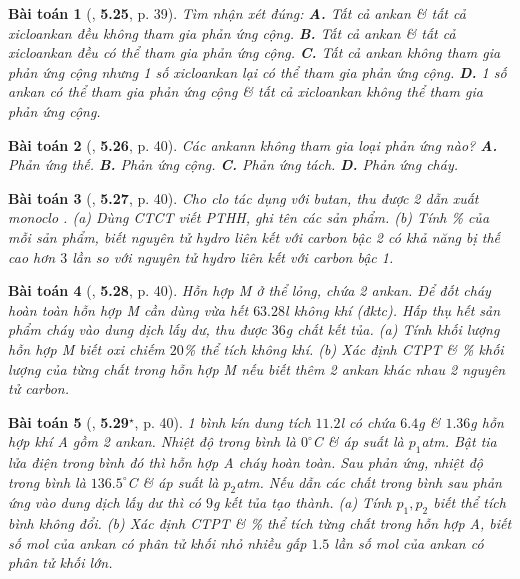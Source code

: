 \documentclass{article}
\numberwithin{equation}{section}
\newtheorem{baitoan}{Bài toán}[section]
\begin{document}
\begin{baitoan}[\cite{SBT_Hoa_Hoc_11_co_ban}, \textbf{5.25}, p. 39]
	Tìm nhận xét đúng: {\bf A.} Tất cả ankan \& tất cả xicloankan đều không tham gia phản ứng cộng. {\bf B.} Tất cả ankan \& tất cả xicloankan đều có thể tham gia phản ứng cộng. {\bf C.} Tất cả ankan không tham gia phản ứng cộng nhưng 1 số xicloankan lại có thể tham gia phản ứng cộng. {\bf D.} 1 số ankan có thể tham gia phản ứng cộng \& tất cả xicloankan không thể tham gia phản ứng cộng.
\end{baitoan}

\begin{baitoan}[\cite{SBT_Hoa_Hoc_11_co_ban}, \textbf{5.26}, p. 40]
	Các ankann không tham gia loại phản ứng nào? {\bf A.} Phản ứng thế. {\bf B.} Phản ứng cộng. {\bf C.} Phản ứng tách. {\bf D.} Phản ứng cháy.
\end{baitoan}

\begin{baitoan}[\cite{SBT_Hoa_Hoc_11_co_ban}, \textbf{5.27}, p. 40]
	Cho clo tác dụng với butan, thu được 2 dẫn xuất monoclo \emph{}. (a) Dùng CTCT viết PTHH, ghi tên các sản phẩm. (b) Tính \% của mỗi sản phẩm, biết nguyên tử hydro liên kết với carbon bậc 2 có khả năng bị thế cao hơn $3$ lần so với nguyên tử hydro liên kết với carbon bậc 1.
\end{baitoan}

\begin{baitoan}[\cite{SBT_Hoa_Hoc_11_co_ban}, \textbf{5.28}, p. 40]
	Hỗn hợp M ở thể lỏng, chứa 2 ankan. Để đốt cháy hoàn toàn hỗn hợp M cần dùng vừa hết $63.28$\emph{l} không khí (đktc). Hấp thụ hết sản phẩm cháy vào dung dịch \emph{} lấy dư, thu được $36$\emph{g} chất kết tủa. (a) Tính khối lượng hỗn hợp M biết oxi chiếm $20$\% thể tích không khí. (b) Xác định CTPT \& \% khối lượng của từng chất trong hỗn hợp M nếu biết thêm 2 ankan khác nhau 2 nguyên tử carbon.
\end{baitoan}

\begin{baitoan}[\cite{SBT_Hoa_Hoc_11_co_ban}, \textbf{5.29}${}^\star$, p. 40]
	1 bình kín dung tích $11.2$\emph{l} có chứa $6.4$\emph{g} \emph{} \& $1.36$\emph{g} hỗn hợp khí A gồm 2 ankan. Nhiệt độ trong bình là $0^\circ$C \& áp suất là $p_1$\emph{atm}. Bật tia lửa điện trong bình đó thì hỗn hợp A cháy hoàn toàn. Sau phản ứng, nhiệt độ trong bình là $136.5^\circ$C \& áp suất là $p_2$\emph{atm}. Nếu dẫn các chất trong bình sau phản ứng vào dung dịch \emph{} lấy dư thì có $9$\emph{g} kết tủa tạo thành. (a) Tính $p_1,p_2$ biết thể tích bình không đổi. (b) Xác định CTPT \& \% thể tích từng chất trong hỗn hợp A, biết số mol của ankan có phân tử khối nhỏ nhiều gấp $1.5$ lần số mol của ankan có phân tử khối lớn.
\end{baitoan}
\end{document}
